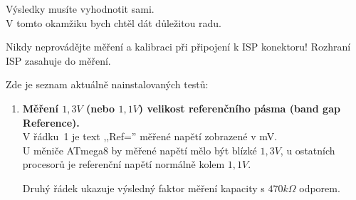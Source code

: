 Výsledky musíte vyhodnotit sami.\\
V tomto okamžiku bych chtěl dát důležitou radu.

Nikdy neprovádějte měření a kalibraci při připojení k ISP konektoru! Rozhraní ISP zasahuje do měření.

\vspace{1cm}
Zde je seznam aktuálně nainstalovaných testů:
\vspace{1cm}

\begin{enumerate}

\item {\bf Měření \(1,3V\) (nebo \(1,1V\)) velikost referenčního pásma (band gap Reference).}\\V řádku~1 je text ,,Ref='' měřené napětí zobrazené v mV.\\
U měniče ATmega8 by měřené napětí mělo být blízké \(1,3V\), u ostatních procesorů je referenční napětí normálně kolem \(1,1V\).

Druhý řádek ukazuje výsledný faktor měření kapacity s \(470k\Omega\) odporem.


\end{enumerate}
